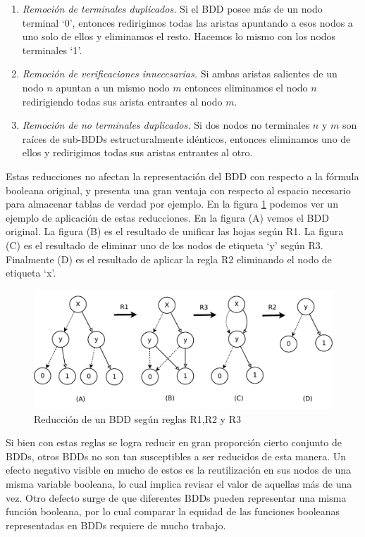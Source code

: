 \documentclass[titlepage, 12pt]{book}
\begin{document}
\begin{enumerate}[R1--]
\item \textit{Remoci\'on de terminales duplicados.} Si el BDD posee m\'as de un nodo terminal `0', entonces redirigimos todas las aristas apuntando a esos nodos a uno solo de ellos y eliminamos el resto. Hacemos lo mismo con los nodos terminales `1'.
\item \textit{Remoci\'on de verificaciones innecesarias.} Si ambas aristas salientes de un nodo $n$ apuntan a un mismo nodo $m$ entonces eliminamos el nodo $n$ redirigiendo todas sus arista entrantes al nodo $m$.
\item \textit{Remoci\'on de no terminales duplicados.} Si dos nodos no terminales $n$ y $m$ son ra\'ices de sub-BDDs estructuralmente id\'enticos, entonces eliminamos uno de ellos y redirigimos todas sus aristas entrantes al otro.
\end{enumerate}

Estas reducciones no afectan la representaci\'on del BDD con respecto a la f\'ormula booleana original, y presenta una gran ventaja con respecto al espacio necesario para almacenar tablas de verdad por ejemplo. En la figura \ref{reduccionBDD} podemos ver un ejemplo de aplicaci\'on de estas reducciones. En la figura (A) vemos el BDD original. La figura (B) es el resultado de unificar las hojas seg\'un R1. La figura (C) es el resultado de eliminar uno de los nodos de etiqueta `y' seg\'un R3. Finalmente (D) es el resultado de aplicar la regla R2 eliminando el nodo de etiqueta `x'.

\begin{figure}[htp]
  \centering
    \includegraphics[scale=0.75]{Imagenes/reduccionBDD.pdf}
  \caption{Reducci\'on de un BDD seg\'un reglas R1,R2 y R3}
  \label{reduccionBDD}
\end{figure}


Si bien con estas reglas se logra reducir en gran proporci\'on cierto conjunto de BDDs, otros BDDs no son tan susceptibles a ser reducidos de esta manera. Un efecto negativo visible en mucho de estos es la reutilizaci\'on en sus nodos de una misma variable booleana, lo cual implica revisar el valor de aquellas m\'as de una vez. Otro defecto surge de que diferentes BDDs pueden representar una misma funci\'on booleana, por lo cual comparar la equidad de las funciones booleanas representadas en BDDs requiere de mucho trabajo.
\end{document}
